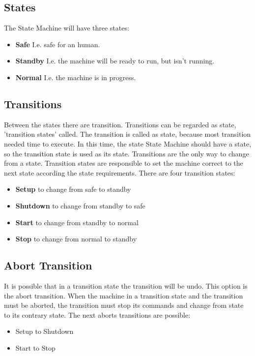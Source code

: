 \documentclass[12pt,a4paper]{report}
\begin{document}
\subsection{States}
The State Machine will have three states:
\begin{itemize}
\item \textbf{Safe} I.e. safe for an human.
\item \textbf{Standby} I.e. the machine will be ready to run, but isn’t running.
\item \textbf{Normal} I.e. the machine is in progress.
\end{itemize}
\newpage
\subsection{Transitions}
Between the states there are transition. Transitions can be regarded as state, 'transition states' called. The transition is called as state, because most transition needed time to execute. In this time, the state State Machine should have a state, so the transition state is used as its state. Transitions are the only way to change from a state. Transition states are responsible to set the machine correct to the next state according the state requirements.  
There are four transition states:
\begin{itemize}
\item \textbf{Setup} to change from safe to standby
\item \textbf{Shutdown} to change from standby to safe
\item \textbf{Start} to change from standby to normal
\item \textbf{Stop} to change from normal to standby
\end{itemize}

\subsection{Abort Transition}
It is possible that in a transition state the transition will be undo. This option is the abort transition. When the machine in a transition state and the transition must be aborted, the transition must stop its commands and change from state to its contrary state. 
The next aborts transitions are possible:
\begin{itemize}
\item Setup to Shutdown
\item Start to Stop
\end{itemize}
\end{document}
